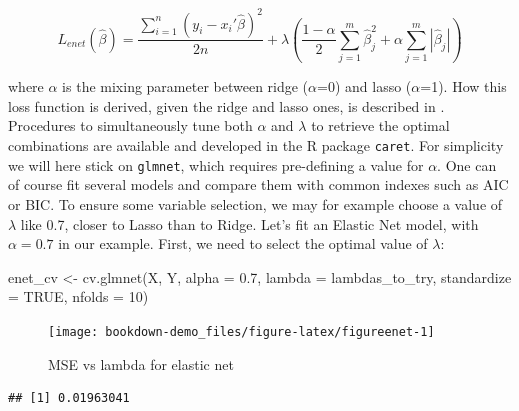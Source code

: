 \documentclass[
]{book}
\newenvironment{Shaded}{\begin{snugshade}}{\end{snugshade}}
\newcommand{\AttributeTok}[1]{\textcolor[rgb]{0.77,0.63,0.00}{#1}}
\newcommand{\ConstantTok}[1]{\textcolor[rgb]{0.00,0.00,0.00}{#1}}
\newcommand{\DecValTok}[1]{\textcolor[rgb]{0.00,0.00,0.81}{#1}}
\newcommand{\FloatTok}[1]{\textcolor[rgb]{0.00,0.00,0.81}{#1}}
\newcommand{\FunctionTok}[1]{\textcolor[rgb]{0.00,0.00,0.00}{#1}}
\newcommand{\NormalTok}[1]{#1}
\newcommand{\OtherTok}[1]{\textcolor[rgb]{0.56,0.35,0.01}{#1}}
\newcommand{\SpecialCharTok}[1]{\textcolor[rgb]{0.00,0.00,0.00}{#1}}
\begin{document}
\[L_{enet}(\hat{\beta})=\frac{\sum_{i=1}^n(y_i-x_i'\hat{\beta})^2}{2n}+\lambda\left(\frac{1-\alpha}{2}\sum_{j=1}^m\hat{\beta}_j^2+\alpha\sum_{j=1}^m|\hat{\beta}_j|\right)\]

where \(\alpha\) is the mixing parameter between ridge (\(\alpha\)=0) and lasso (\(\alpha\)=1). How this loss function is derived, given the ridge and lasso ones, is described in \citet{zou2005regularization}. Procedures to simultaneously tune both \(\alpha\) and \(\lambda\) to retrieve the optimal combinations are available and developed in the R package \texttt{caret}. For simplicity we will here stick on \texttt{glmnet}, which requires pre-defining a value for \(\alpha\). One can of course fit several models and compare them with common indexes such as AIC or BIC. To ensure some variable selection, we may for example choose a value of \(\lambda\) like 0.7, closer to Lasso than to Ridge. Let's fit an Elastic Net model, with \(\alpha=0.7\) in our example. First, we need to select the optimal value of \(\lambda\):

\begin{Shaded}
\begin{Highlighting}[]
\NormalTok{enet\_cv }\OtherTok{\textless{}{-}} \FunctionTok{cv.glmnet}\NormalTok{(X, Y, }\AttributeTok{alpha =} \FloatTok{0.7}\NormalTok{, }\AttributeTok{lambda =}\NormalTok{ lambdas\_to\_try,}
                     \AttributeTok{standardize =} \ConstantTok{TRUE}\NormalTok{, }\AttributeTok{nfolds =} \DecValTok{10}\NormalTok{)}
\end{Highlighting}
\end{Shaded}

\begin{figure}[H]

{\centering \texttt{[image: bookdown-demo\_files/figure-latex/figureenet-1]} 

}

\caption{MSE vs lambda for elastic net}\label{fig:figureenet}
\end{figure}

\begin{Shaded}
\end{Shaded}

\begin{verbatim}
## [1] 0.01963041
\end{verbatim}
\end{document}

